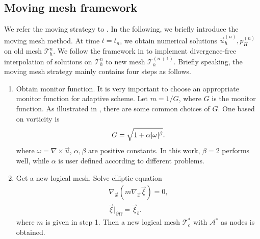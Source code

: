\documentclass{eajam}
\begin{document}
  \subsection{Moving mesh framework}
     \label{sec4} We refer the moving strategy to
     \cite{di2005moving}. In the following, we briefly introduce the
     moving mesh method. At time $t = t_{n}$, we obtain  numerical
     solutions $\vec{u}_h^{(n)}, p_H^{(n)}$ on old 
     mesh $\mathcal{T}_h^n$. We follow the framework in
     \cite{di2005moving} to implement divergence-free 
     interpolation of solutions on $\mathcal{T}_h^n$ to new mesh
     $\mathcal{T}_h^{(n + 1)}$. Briefly speaking, the moving mesh
     strategy mainly contains four steps as follows.
     \begin{enumerate}[step 1]
     \item Obtain monitor function. It is very important to choose an
       appropriate monitor function for adaptive scheme. Let $m = 1/G$,
       where $G$ is the monitor function. As illustrated in
       \cite{di2005moving}, there are some common choices of $G$. One
       based on vorticity is 
       \begin{equation} 
         \centering
         G = \sqrt{1 + \alpha |\omega|^\beta}.
         \label{eq::monitor_vorticity}
       \end{equation}
       where $\omega = \nabla \times \vec{u}$, $\alpha, \beta$
       are positive constants. In this work, $\beta = 2$ performs 
       well, while $\alpha$ is user defined according to different
       problems. 

     \item Get a new logical mesh. Solve elliptic equation 
       \begin{equation}
         \begin{aligned}
           \nabla_{\vec{x}}(m \nabla_{\vec{x}} \vec{\xi}) = 0, \\
           \vec{\xi}|_{\partial \Omega} = \vec{\xi}_b.
         \end{aligned}
         \label{eq::logical}
       \end{equation}
       where $m$ is given in step 1. Then a new logical mesh
       $\mathcal{T}_c^*$ with $\mathcal{A}^*$ as nodes is obtained.


\end{enumerate}
\end{document}
